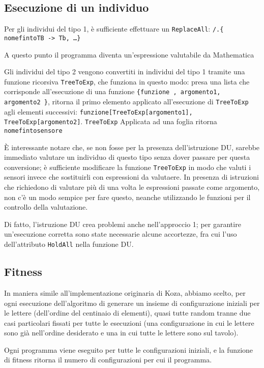 \documentclass[paper=a4, fontsize=11pt]{scrartcl}
\numberwithin{equation}{section}		%
\numberwithin{figure}{section}			%
\numberwithin{table}{section}				%
\begin{document}
\subsection{Esecuzione di un individuo}
Per gli individui del tipo 1, è sufficiente effettuare un \texttt{ReplaceAll}: \texttt{/.\{ nomefintoTB -> Tb, \dots  \}}

A questo punto il programma diventa un'espressione valutabile da Mathematica

Gli individui del tipo 2 vengono convertiti in individui del tipo 1 tramite una funzione ricorsiva \texttt{TreeToExp}, che funziona in questo modo: presa una lista che corrisponde all'esecuzione di una funzione \texttt{\{funzione , argomento1, argomento2   \}}, ritorna il primo elemento applicato all'esecuzione di \texttt{TreeToExp} agli elementi successivi: \texttt{funzione[TreeToExp[argomento1], TreeToExp[argomento2]}.
\texttt{TreeToExp} Applicata ad una foglia ritorna \texttt{nomefintosensore}

È interessante notare che, se non fosse per la presenza dell'istruzione DU, sarebbe immediato valutare un individuo di questo tipo senza dover passare per questa conversione; è sufficiente modificare la funzione \texttt{TreeToExp} in modo che valuti i sensori invece che sostituirli con espressioni da valutaere. In presenza di istruzioni che richiedono di valutare più di una volta le espressioni passate come argomento, non c'è un modo sempice per fare questo, neanche utilizzando le funzioni per il controllo della valutazione.

Di fatto, l'istruzione DU crea problemi anche nell'approccio 1; per garantire un'esecuzione corretta sono state necessarie alcune accortezze, fra cui l'uso dell'attributo \texttt{HoldAll} nella funzione DU.


\subsection{Fitness}
In maniera simile all'implementazione originaria di Koza, abbiamo scelto, per ogni esecuzione dell'algoritmo di generare un insieme di configurazione iniziali per le lettere (dell'ordine del centinaio di elementi), quasi tutte random tranne due casi particolari fissati per tutte le esecuzioni (una configurazione in cui le lettere sono già nell'ordine desiderato e una in cui tutte le lettere sono sul tavolo).

Ogni programma viene eseguito per tutte le configurazioni iniziali, e la funzione di fitness ritorna il numero di configurazioni per cui il programma.
\end{document}
